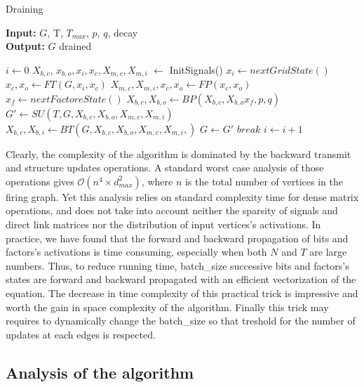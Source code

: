 \documentclass[a4paper, 11pt]{article}
\begin{document}
\begin{algorithm}[H]
\caption{Draining}
\textbf{Input:} $G$, T, $T_{max}$, $p$, $q$, decay\\
\textbf{Output:} $G$ drained
\begin{algorithmic}
\State $i \gets 0$
\State $X_{b,c}$, $x_{b, o}, x_i, x_c, X_{m, c}, X_{m, i}$ $\gets$ InitSignals()
 \State $x_i \gets nextGridState()$
 \State $x_c, x_o \gets \textit{FT}(G, x_i, x_c)$
 \State $X_{m, c}, X_{m, i}, x_c, x_o \gets \textit{FP}(x_c, x_o)$
  \State $x_f \gets nextFactoreState()$
  \State $X_{b,c}, X_{b, o} \gets \textit{BP}(X_{b, c}, X_{b, o} x_f, p, q)$
  \State $G' \gets \textit{SU}(T, G, X_{b, c}, X_{b, o}, X_{m, c}, X_{m, i})$
  \State $X_{b, c}, X_{b, i} \gets \textit{BT}(G, X_{b, c}, X_{b, o}, X_{m, c}, X_{m, i}, )$
  \State $G \gets G'$
 \EndIf	
  \State $break$
 \EndIf	
 \State $i \gets i + 1$ 
\EndWhile
\end{algorithmic}
\end{algorithm}

Clearly, the complexity of the algorithm is dominated by the backward transmit and structure updates operations. A standard worst case analysis of those operations gives $\mathcal{O}(n^{4} \times d_{max}^2)$, where $n$ is the total number of vertices in the firing graph. Yet this analysis relies on standard complexity time for dense matrix operations, and does not take into account neither the sparsity of signals and direct link matrices nor the distribution of input vertices's activations. In practice, we have found that the forward and backward propagation of bits and factors's activations is time consuming, especially when both $N$ and $T$ are large numbers. Thus, to reduce running time, batch\_size successive bits and factors's states are forward and backward propagated with an efficient vectorization of the equation. The decrease in time complexity of this practical trick is impressive and worth the gain in space complexity of the algorithm. Finally this trick may requires to dynamically change the batch\_size so that treshold for the number of updates at each edges is respected.

\subsection{Analysis of the algorithm}
\end{document}
